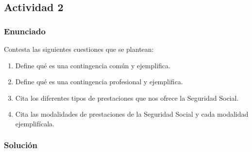 \subsection{Actividad 2}

\subsubsection{Enunciado}
Contesta las siguientes cuestiones que se plantean:

\begin{enumerate}[label=\alph*)]
    \item Define qué es una contingencia común y ejemplifica.
    \item Define qué es una contingencia profesional y ejemplifica.
    \item Cita los diferentes tipos de prestaciones que nos ofrece la Seguridad Social.
    \item Cita las modalidades de prestaciones de la Seguridad Social y cada modalidad ejemplifícala.
\end{enumerate}

\subsubsection{Solución}

